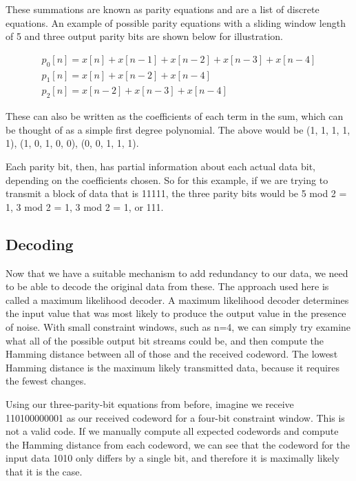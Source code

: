 \documentclass[12pt]{article}
\begin{document}
These summations are known as parity equations and are a list of discrete equations. An example of possible parity equations with a sliding window length of 5 and three output parity bits are shown below for illustration.

\begin{equation}
  \begin{array}{l}
	p_0[n] = x[n] + x[n-1] + x[n-2] + x[n-3] + x[n-4] \\
	p_1[n] = x[n] + x[n-2] + x[n-4]  \\
	p_2[n] = x[n-2] + x[n-3] + x[n-4]
  \end{array} 
\end{equation}

These can also be written as the coefficients of each term in the sum, which can be thought of as a simple first degree polynomial. The above would be (1, 1, 1, 1, 1), (1, 0, 1, 0, 0), (0, 0, 1, 1, 1).

Each parity bit, then, has partial information about each actual data bit, depending on the coefficients chosen. So for this example, if we are trying to transmit a block of data that is 11111, the three parity bits would be 5 mod 2 = 1, 3 mod 2 = 1, 3 mod 2 = 1, or 111. \cite{rsg}

\subsection{Decoding}

Now that we have a suitable mechanism to add redundancy to our data, we need to be able to decode the original data from these. The approach used here is called a maximum likelihood decoder. A maximum likelihood decoder determines the input value that was most likely to produce the output value in the presence of noise. With small constraint windows, such as n=4, we can simply try examine what all of the possible output bit streams could be, and then compute the Hamming distance between all of those and the received codeword. The lowest Hamming distance is the maximum likely transmitted data, because it requires the fewest changes.

Using our three-parity-bit equations from before, imagine we receive 110100000001 as our received codeword for a four-bit constraint window. This is not a valid code. If we manually compute all expected codewords and compute the Hamming distance from each codeword, we can see that the codeword for the input data 1010 only differs by a single bit, and therefore it is maximally likely that it is the case. \cite{rsg}
\end{document}
